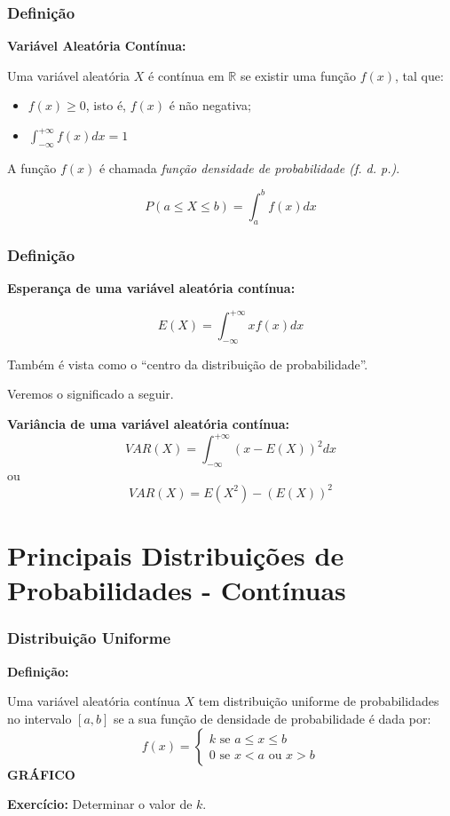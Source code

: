 \documentclass[hyperref={pdfpagelabels=false}]{beamer}
\begin{document}
\begin{frame}
	\frametitle{Definição}
	
{\bf Variável Aleatória Contínua:}

Uma variável aleatória $X$ é contínua em $\mathbb{R}$ se existir uma função $f(x)$, tal que: \pause
\begin{itemize}
	\item $f(x) \geq 0$, isto é, $f(x)$ é não negativa; \pause
	\item $\displaystyle \int_{- \infty}^{+ \infty}f(x)dx = 1$ \pause
\end{itemize}
	
	A função $f(x)$ é chamada \emph{função densidade de probabilidade (f. d. p.)}. \pause
	
	$$P(a \leq X\leq b) = \displaystyle \int_{a}^{b}f(x)dx$$
	
\end{frame}

\begin{frame}
\frametitle{Definição}
	
{\bf Esperança de uma variável aleatória contínua:} \pause

$$E(X) = \displaystyle \int_{- \infty}^{+ \infty}xf(x)dx$$ \pause

Também é vista como o ``centro da distribuição de probabilidade''. \pause

Veremos o significado a seguir. \pause

{\bf Variância de uma variável aleatória contínua:} \pause
$$VAR(X) = \displaystyle \int_{- \infty}^{+ \infty}(x - E(X))^2 dx$$ \pause
ou
$$VAR(X) = E(X^2) - (E(X))^2$$
	
\end{frame}

\section{Principais Distribuições de Probabilidades - Contínuas}

\begin{frame}
\frametitle{Distribuição Uniforme}

{\bf Definição:}

Uma variável aleatória contínua $X$ tem distribuição uniforme de probabilidades no intervalo $[a,b]$ se a sua função de densidade de probabilidade é dada por: \pause
$$f(x) = \begin{cases}
k \text{ se } a \leq x \leq b \\
0 \text{ se } x < a \text{ ou } x > b
\end{cases}$$
\pause
{\bf GRÁFICO}
\pause

{\bf Exercício:} Determinar o valor de $k$.

\end{frame}
\end{document}
